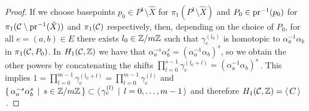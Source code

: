 \documentclass[main.tex]{subfiles}
\begin{document}
\begin{proof}
  If we choose basepoints $p_0 \in P^1 \setminus \hat{X}$ for $\pi_1(P^1 \setminus \hat{X})$ and $P_0 \in \operatorname{pr}^{-1}(p_0)$ for $\pi_1(\mathcal{C} \setminus \operatorname{pr}^{-1}(\hat{X}))$ and $\pi_1(\mathcal{C})$ respectively, then,
  depending on the choice of $P_0$, for all $e = (a,b) \in E$ there exists $l_0 \in \mathbb{Z}/m\mathbb{Z}$ such that $\gamma_e^{(l_0)}$ is homotopic to $\alpha_a^{-1} \alpha_b$ in $\pi_1(\mathcal{C},P_0)$. 
   In $H_1(\mathcal{C},\mathbb{Z})$ we have that $\alpha_a^{-s}\alpha_b^{s} = ( \alpha_a^{-1}\alpha_b)^s$, so we obtain the other powers by concatenating
  the shifts $\prod_{l = 0}^{s-1} \gamma_e^{(l_0+l)} = (\alpha_a^{-1}\alpha_b)^s$\,.
  This implies $1 = \prod_{l = 0}^{m-1} \gamma_e^{(l_0+l)} = \prod_{l = 0}^{m-1} \gamma_e^{(l)}$ and 
   $\{ \, \alpha_a^{-s} \alpha_b^{s} \, \mid \, s \in \mathbb{Z}/m\mathbb{Z} \, \} \subset  \langle \, \gamma_e^{(l)} \,
  \mid \, l = 0,\dots,m-1 \,\rangle$ and therefore $H_1(\mathcal{C},\mathbb{Z}) = \langle \, C \, \rangle$\,.
  
  \end{proof}
\end{document}
